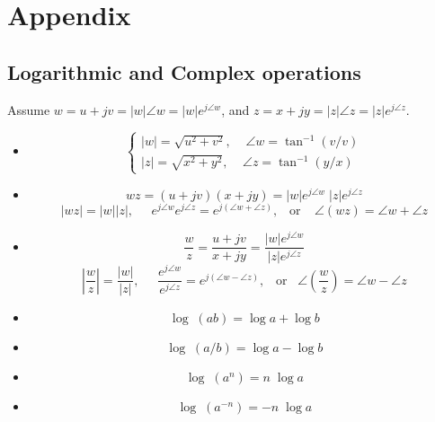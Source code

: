 \documentclass{article}
\begin{document}
\section*{Appendix}

\subsection*{Logarithmic and Complex operations}

Assume $w=u+jv=|w|\angle w=|w|e^{j\angle w}$, and $z=x+jy=|z|\angle z=|z|e^{j\angle z}$. 
\begin{itemize}
\item 
  \begin{equation}
    \left\{ \begin{array}{l}
      |w|=\sqrt{u^2+v^2},\;\;\;\;\angle w=\tan^{-1}\left( v/v \right) \\
      |z|=\sqrt{x^2+y^2},\;\;\;\;\angle z=\tan^{-1}\left( y/x \right) \end{array} \right. 
  \end{equation}
\item 
  \begin{equation}
    w z=(u+jv)(x+jy)=|w|e^{j\angle w}\;|z|e^{j\angle z} 
  \end{equation}
  \begin{equation}
    \left| wz \right| =|w||z|,\;\;\;\;\;
    e^{j\angle w} e^{j\angle z}=e^{j(\angle w+\angle z)},
    \;\;\;\mbox{or}\;\;\;\;
    \angle \left( wz \right) =\angle w+\angle z 
  \end{equation}
\item 
  \begin{equation}
    \frac{w}{z}=\frac{u+jv}{x+jy}=\frac{|w|e^{j\angle w}}{|z|e^{j\angle z}} 
  \end{equation}
  \begin{equation}
    \left| \frac{w}{z} \right| =\frac{|w|}{|z|},\;\;\;\;\;
    \frac{e^{j\angle w}}{e^{j\angle z}}=e^{j(\angle w-\angle z)},\;\;\;\mbox{or}\;\;\;
    \angle \left( \frac{w}{z} \right)=\angle w-\angle z  
  \end{equation}
\end{itemize}

\begin{itemize}
\item 
  \begin{equation} 
    \log \;(ab)=\log a+\log b 
  \end{equation}
\item \begin{equation} 
  \log \;(a/b)=\log a-\log b 
\end{equation}
\item 
  \begin{equation} 
    \log \;(a^n)=n\;\log a 
  \end{equation}
\item 
  \begin{equation} 
    \log \;(a^{-n})=-n\;\log a 
  \end{equation}
\end{itemize}
\end{document}
